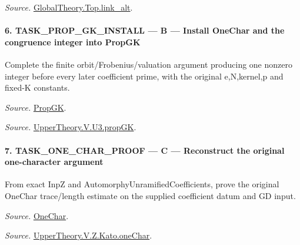 \documentclass[11pt,a4paper]{article}
\numberwithin{equation}{section}
\theoremstyle{remark}\newtheorem{remark}[theorem]{Remark}
\begin{document}
\emph{Source.} \href{https://github.com/CocoSgt/riemann-hypothesis-lean/blob/7cbf7a0c32fca1badf05931879a37c3f8a2b03b4/src/Development/AbelianVarietyTheory/Proofs/GlobalInterpolation/LinkAlt.lean#L16-L50}{GlobalTheory.Top.link\_\allowbreak alt}.



\paragraph{6. TASK\_\allowbreak PROP\_\allowbreak GK\_\allowbreak INSTALL — B — Install OneChar and the congruence integer into PropGK}

Complete the finite orbit/Frobenius/valuation argument producing one nonzero integer before every later coefficient prime, with the original e,N,kernel,p and fixed-K constants.

\emph{Source.} \href{https://github.com/CocoSgt/riemann-hypothesis-lean/blob/7cbf7a0c32fca1badf05931879a37c3f8a2b03b4/src/Development/AutomorphicArithmetic/AutomorphicVarieties/UnitaryThreeGroups/KatoUse.lean#L36-L42}{PropGK}.

\emph{Source.} \href{https://github.com/CocoSgt/riemann-hypothesis-lean/blob/7cbf7a0c32fca1badf05931879a37c3f8a2b03b4/src/Development/AutomorphicArithmetic/AutomorphicVarieties/UnitaryThreeGroups/OrbEquiv.lean#L111-L173}{UpperTheory.V.U3.propGK}.



\paragraph{7. TASK\_\allowbreak ONE\_\allowbreak CHAR\_\allowbreak PROOF — C — Reconstruct the original one-character argument}

From exact InpZ and AutomorphyUnramifiedCoefficients, prove the original OneChar trace/length estimate on the supplied coefficient datum and GD input.

\emph{Source.} \href{https://github.com/CocoSgt/riemann-hypothesis-lean/blob/7cbf7a0c32fca1badf05931879a37c3f8a2b03b4/src/Development/AutomorphicArithmetic/AutomorphicVarieties/UnitaryThreeGroups/KatoUse.lean#L54-L64}{OneChar}.

\emph{Source.} \href{https://github.com/CocoSgt/riemann-hypothesis-lean/blob/7cbf7a0c32fca1badf05931879a37c3f8a2b03b4/src/Development/AutomorphicArithmetic/AutomorphicVarieties/ModularityArgument/KatoQuadraticCharacters/OneChar.lean#L158-L178}{UpperTheory.V.Z.Kato.oneChar}.
\end{document}
